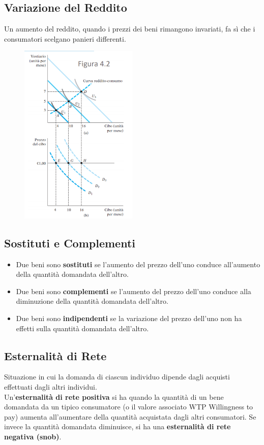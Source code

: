 \documentclass[12pt]{article}
\begin{document}
\subsection{Variazione del Reddito}
Un aumento del reddito, quando i prezzi dei beni rimangono invariati, fa sì che i consumatori scelgano panieri differenti.
\FloatBarrier
\begin{figure}[!htb]
    \centering
    \includegraphics[width=0.5\textwidth]{images/varRed.png}
\end{figure}
\FloatBarrier

\subsection{Sostituti e Complementi}
\begin{itemize}
    \item Due beni sono \textbf{sostituti} se l’aumento del prezzo dell’uno conduce all’aumento della quantità domandata dell’altro.
    \item Due beni sono \textbf{complementi} se l’aumento del prezzo dell’uno conduce alla diminuzione della quantità domandata dell’altro.
    \item Due beni sono \textbf{indipendenti} se la variazione del prezzo dell’uno non ha effetti sulla quantità domandata dell’altro.
\end{itemize}
\subsection{Esternalità di Rete}
Situazione in cui la domanda di ciascun individuo dipende dagli acquisti
effettuati dagli altri individui.\\
Un’\textbf{esternalità di rete positiva} si ha quando la quantità di un bene domandata da un tipico consumatore (o il valore associato WTP Willingness to pay) aumenta all’aumentare della quantità acquistata dagli altri consumatori. Se invece la quantità domandata diminuisce, si ha una \textbf{esternalità di rete negativa (snob)}.
\end{document}
